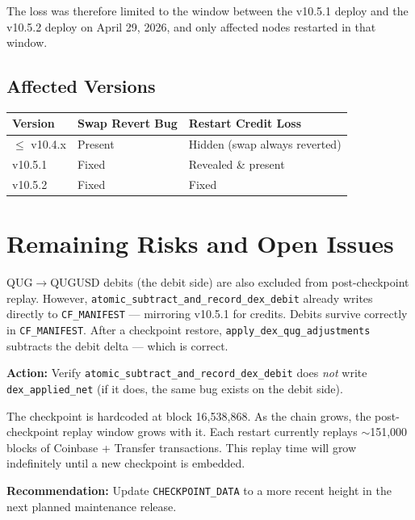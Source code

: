 \documentclass[11pt,a4paper]{article}
\begin{document}
The loss was therefore limited to the window between the v10.5.1 deploy and the
v10.5.2 deploy on April 29, 2026, and only affected nodes restarted in that window.

\subsection{Affected Versions}

\begin{center}
\begin{tabular}{lll}
\toprule
\textbf{Version} & \textbf{Swap Revert Bug} & \textbf{Restart Credit Loss} \\
\midrule
$\leq$ v10.4.x & \textcolor{qugred}{Present} & Hidden (swap always reverted) \\
v10.5.1        & \textcolor{quggreen}{Fixed} & \textcolor{qugred}{Revealed \& present} \\
v10.5.2        & \textcolor{quggreen}{Fixed} & \textcolor{quggreen}{Fixed} \\
\bottomrule
\end{tabular}
\end{center}

\section{Remaining Risks and Open Issues}

\begin{noticebox}
QUG$\to$QUGUSD debits (the debit side) are also excluded from post-checkpoint
replay.  However, \texttt{atomic\_subtract\_and\_record\_dex\_debit} already
writes directly to \texttt{CF\_MANIFEST} — mirroring v10.5.1 for credits.
Debits survive correctly in \texttt{CF\_MANIFEST}.  After a checkpoint restore,
\texttt{apply\_dex\_qug\_adjustments} subtracts the debit delta — which is
correct.

\textbf{Action:} Verify \texttt{atomic\_subtract\_and\_record\_dex\_debit} does
\emph{not} write \texttt{dex\_applied\_net} (if it does, the same bug exists on
the debit side).
\end{noticebox}

\medskip

\begin{infobox}
The checkpoint is hardcoded at block 16,538,868.  As the chain grows, the
post-checkpoint replay window grows with it.  Each restart currently replays
$\sim$151,000 blocks of Coinbase + Transfer transactions.  This replay time
will grow indefinitely until a new checkpoint is embedded.

\textbf{Recommendation:} Update \texttt{CHECKPOINT\_DATA} to a more recent height
in the next planned maintenance release.
\end{infobox}
\end{document}
